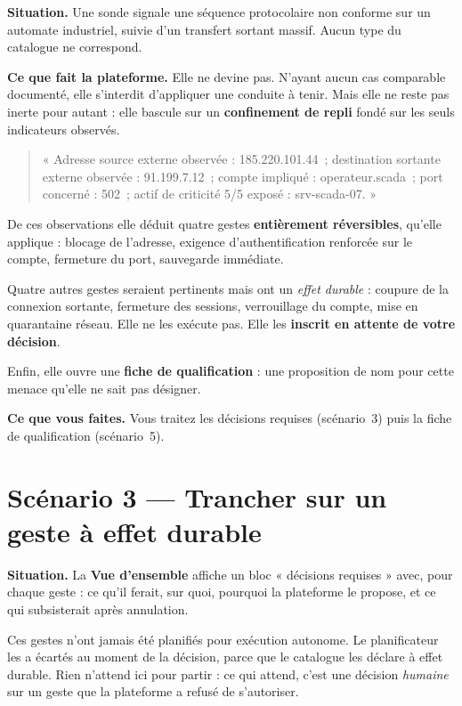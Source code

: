 \textbf{Situation.} Une sonde signale une séquence protocolaire non conforme
sur un automate industriel, suivie d'un transfert sortant massif. Aucun type du
catalogue ne correspond.

\textbf{Ce que fait la plateforme.} Elle ne devine pas. N'ayant aucun cas
comparable documenté, elle s'interdit d'appliquer une conduite à tenir. Mais
elle ne reste pas inerte pour autant : elle bascule sur un \textbf{confinement
de repli} fondé sur les seuls indicateurs observés.

\begin{quote}
\small
« Adresse source externe observée : 185.220.101.44~; destination sortante
externe observée : 91.199.7.12~; compte impliqué : operateur.scada~; port
concerné : 502~; actif de criticité 5/5 exposé : srv-scada-07. »
\end{quote}

De ces observations elle déduit quatre gestes \textbf{entièrement réversibles},
qu'elle applique : blocage de l'adresse, exigence d'authentification renforcée
sur le compte, fermeture du port, sauvegarde immédiate.

Quatre autres gestes seraient pertinents mais ont un \emph{effet durable} :
coupure de la connexion sortante, fermeture des sessions, verrouillage du
compte, mise en quarantaine réseau. Elle ne les exécute pas. Elle les
\textbf{inscrit en attente de votre décision}.

Enfin, elle ouvre une \textbf{fiche de qualification} : une proposition de nom
pour cette menace qu'elle ne sait pas désigner.

\textbf{Ce que vous faites.} Vous traitez les décisions requises
(scénario~3) puis la fiche de qualification (scénario~5).

\section{Scénario 3 --- Trancher sur un geste à effet durable}

\textbf{Situation.} La \textbf{Vue d'ensemble} affiche un bloc « décisions
requises » avec, pour chaque geste : ce qu'il ferait, sur quoi, pourquoi la
plateforme le propose, et ce qui subsisterait après annulation.

\begin{tcolorbox}[colback=green!4!white, colframe=darkgreen,
  title=\textbf{Bon à savoir --- ce n'est pas une validation préalable},
  fonttitle=\bfseries, boxrule=0.6pt]
Ces gestes n'ont jamais été planifiés pour exécution autonome. Le planificateur
les a écartés au moment de la décision, parce que le catalogue les déclare à
effet durable. Rien n'attend ici pour partir : ce qui attend, c'est une
décision \emph{humaine} sur un geste que la plateforme a refusé de s'autoriser.
\end{tcolorbox}

